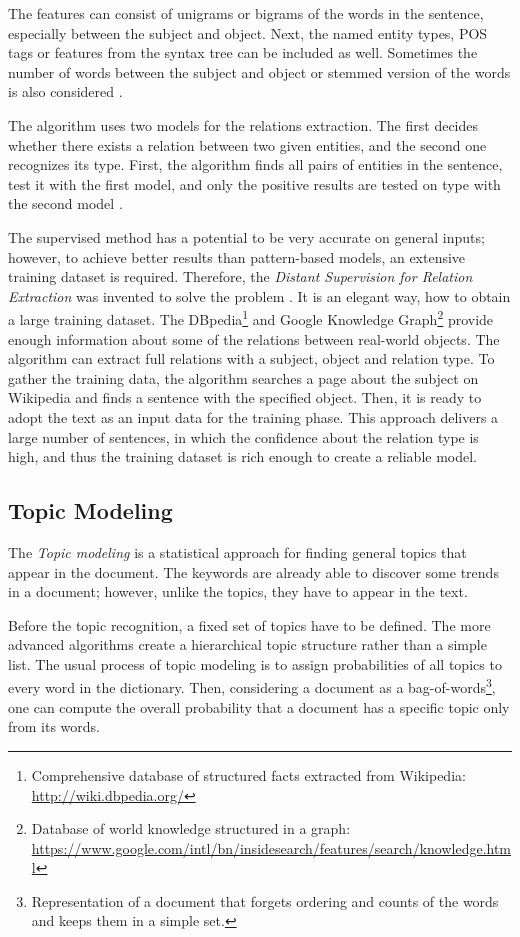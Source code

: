 \documentclass[
  digital, %
  notable,   %
  nolof,     %
  nolot,     %
]{fithesis3}
\begin{document}
The features can consist of unigrams or bigrams of the words in the sentence, especially between the subject and object. Next, the named entity types, POS tags or features from the syntax tree can be included as well. Sometimes the number of words between the subject and object or stemmed version of the words is also considered \cite[sec. 21.2]{jurafsky2014speech}.

The algorithm uses two models for the relations extraction.
The first decides whether there exists a relation between two given entities, and the second one recognizes its type. First, the algorithm finds all pairs of entities in the sentence, test it with the first model, and only the positive results are tested on type with the second model \cite[sec. 21.2]{jurafsky2014speech}.

The supervised method has a potential to be very accurate on general inputs; however, to achieve better results than pattern-based models, an extensive training dataset is required.
Therefore, the \textit{Distant Supervision for Relation Extraction} was invented to solve the problem \cite{mintz2009distant}.
It is an elegant way, how to obtain a large training dataset.
The DBpedia\footnote{Comprehensive database of structured facts extracted from Wikipedia: \mbox{\url{http://wiki.dbpedia.org/}}} and 
Google Knowledge Graph\footnote{Database of world knowledge structured in a graph: \url{https://www.google.com/intl/bn/insidesearch/features/search/knowledge.html}}
provide enough information about some of the relations between real-world objects.
The algorithm can extract full relations with a subject, object and relation type.
To gather the training data, the algorithm searches a page about the subject on Wikipedia and finds a sentence with the specified object.
Then, it is ready to adopt the text as an input data for the training phase.
This approach delivers a large number of sentences, in which the confidence about the relation type is high, and thus the training dataset is rich enough to create a reliable model.

\subsection{Topic Modeling}
\label{topic_modeling}
The \textit{Topic modeling} is a statistical approach for finding general topics that appear in the document.
The keywords are already able to discover some trends in a document; however, unlike the topics, they have to appear in the text.

Before the topic recognition, a fixed set of topics have to be defined.
The more advanced algorithms create a hierarchical topic structure rather than a simple list.
The usual process of topic modeling is to assign probabilities of all topics to every word in the dictionary.
Then, considering a document as a bag-of-words\footnote{Representation of a document that forgets ordering and counts of the words and keeps them in a simple set.}, 
one can compute the overall probability that a document has a specific topic only from its words.
\end{document}
